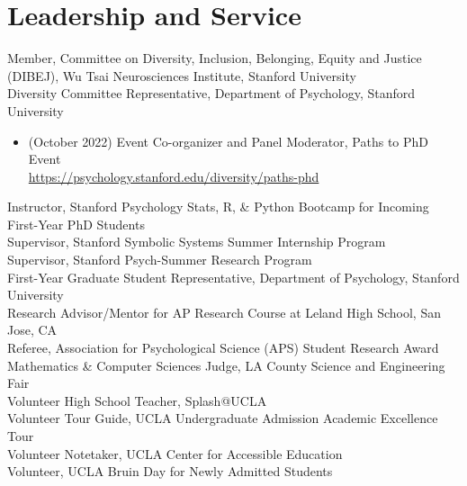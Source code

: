 \section*{Leadership and Service}
Member, Committee on Diversity, Inclusion, Belonging, Equity and Justice (DIBEJ), Wu Tsai Neurosciences Institute, Stanford University\\
Diversity Committee Representative, Department of Psychology, Stanford University
\begin{itemize}[label={*}, leftmargin=0.5cm, topsep=0.2cm]
    \item (October 2022) Event Co-organizer and Panel Moderator, Paths to PhD Event\\ \textcolor{RoyalBlue}{\href{https://psychology.stanford.edu/diversity/paths-phd}{https://psychology.stanford.edu/diversity/paths-phd}}
\end{itemize}
Instructor, Stanford Psychology Stats, R, \& Python Bootcamp for Incoming First-Year PhD Students\\
Supervisor, Stanford Symbolic Systems Summer Internship Program\\
Supervisor, Stanford Psych-Summer Research Program\\
First-Year Graduate Student Representative, Department of Psychology, Stanford University\\
Research Advisor/Mentor for AP Research Course at Leland High School, San Jose, CA\\
Referee, Association for Psychological Science (APS) Student Research Award\\
Mathematics \& Computer Sciences Judge, LA County Science and Engineering Fair\\
Volunteer High School Teacher, Splash@UCLA\\
Volunteer Tour Guide, UCLA Undergraduate Admission Academic Excellence Tour\\
Volunteer Notetaker, UCLA Center for Accessible Education\\
Volunteer, UCLA Bruin Day for Newly Admitted Students